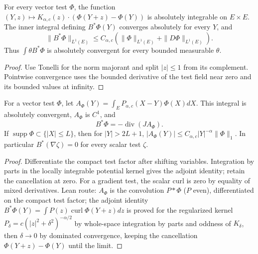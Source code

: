 \begin{lemma}
  \label{lem:c13_adjoint_integrable}
  For every vector test $\Phi$, the function
  $(Y,z)\mapsto K_{\alpha,c}(z)\cdot(\Phi(Y+z)-\Phi(Y))$ is absolutely integrable on $E\times E$.
  The inner integral defining $B^*\Phi(Y)$ converges absolutely for every $Y$, and
  \[
    \|B^*\Phi\|_{L^1(E)}\le C_{\alpha,c}
       (\|\Phi\|_{L^1(E)}+\|D\Phi\|_{L^1(E)}).
  \]
  Thus $\int\theta B^*\Phi$ is absolutely convergent for every bounded measurable $\theta$.
\end{lemma}
\begin{proof}
  Use Tonelli for the norm majorant and split $|z|\le1$ from its complement.
  Pointwise convergence uses the bounded derivative of the test field near zero and its bounded values at infinity.
\end{proof}

\begin{lemma}
  \label{lem:c13_test_potential}
  For a vector test $\Phi$, let $A_\Phi(Y)=\int_E P_{\alpha,c}(X-Y)\Phi(X)dX$.
  This integral is absolutely convergent, $A_\Phi$ is $C^1$, and
  \[
    B^*\Phi=-\operatorname{div}(J A_\Phi).
  \]
  If $\operatorname{supp}\Phi\subset\{|X|\le L\}$, then for $|Y|>2L+1$,
  $|A_\Phi(Y)|\le C_{\alpha,c}|Y|^{-\alpha}\|\Phi\|_1$.
  In particular $B^*(\nabla\zeta)=0$ for every scalar test $\zeta$.
\end{lemma}
\begin{proof}
  Differentiate the compact test factor after shifting variables. Integration by parts in the
  locally integrable potential kernel gives the adjoint identity; retain the cancellation at zero.
  For a gradient test, the scalar curl is zero by equality of mixed derivatives.
  Lean route: $A_\Phi$ is the convolution $P*\Phi$ ($P$ even), differentiated on the compact test factor;
  the adjoint identity $B^*\Phi(Y)=\int P(z)\operatorname{curl}\Phi(Y+z)dz$ is proved for the regularized kernel
  $P_\delta=c(|z|^2+\delta^2)^{-\alpha/2}$ by whole-space integration by parts and oddness of $K_\delta$,
  then $\delta\to0$ by dominated convergence, keeping the cancellation $\Phi(Y+z)-\Phi(Y)$ until the limit.
\end{proof}

